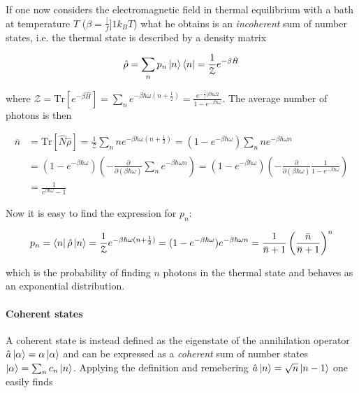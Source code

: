 \documentclass[a4paper, 11pt]{article}
\begin{document}
      If one now considers the electromagnetic field in thermal equilibrium with a bath at temperature $T$ ($\beta = \frac[f]{1}{k_BT}$) what he obtains is an \emph{incoherent} sum of number states, i.e. the thermal state is described by a density matrix

      \begin{equation*}
        \hat{\rho} = \sum_n p_n \ket{n}\bra{n} = \frac{1}{\mathcal{Z}} e^{-\beta\hat{H}}
      \end{equation*}

      where $\mathcal{Z} = \text{Tr}[e^{-\beta\hat{H}}] = \sum_n e^{-\beta\hbar\omega(n + \frac{1}{2})} = \frac{e^{-\frac[f]{\beta\hbar\omega}{2}}}{1 - e^{-\beta\hbar\omega}}$.
      The average number of photons is then

      \begin{align*}
        \overbar{n} & = \text{Tr}[\hat{N}\hat{\rho}] = \frac{1}{\mathcal{Z}} \sum_n n e^{-\beta\hbar\omega(n + \frac{1}{2})}
                      = (1 - e^{-\beta\hbar\omega}) \sum_n n e^{-\beta\hbar\omega n} \\
                    & = (1 - e^{-\beta\hbar\omega}) \left(-\frac{\partial}{\partial(\beta\hbar\omega)} \sum_n e^{-\beta\hbar\omega n} \right)
                      = (1 - e^{-\beta\hbar\omega}) \left(-\frac{\partial}{\partial(\beta\hbar\omega)} \frac{1}{1 - e^{-\beta\hbar\omega}} \right) \\
                    & = \frac{1}{e^{\beta\hbar\omega} - 1}
      \end{align*}

      Now it is easy to find the expression for $p_n$:

      \begin{equation*}
        p_n = \bra{n} \hat{\rho} \ket{n} = \frac{1}{\mathcal{Z}} e^{-\beta\hbar\omega(n + \frac{1}{2})} = (1 - e^{-\beta\hbar\omega}) e^{-\beta\hbar\omega n} = \frac{1}{\overbar{n} + 1} \left(\frac{\overbar{n}}{\overbar{n} + 1} \right)^n
      \end{equation*}

      which is the probability of finding $n$ photons in the thermal state and behaves as an exponential distribution.



    \paragraph{Coherent states}
      A coherent state is instead defined as the eigenstate of the annihilation operator $\hat{a}\ket{\alpha} = \alpha\ket{\alpha}$ and can be expressed as a \emph{coherent} sum of number states $\ket{\alpha} = \sum_n c_n \ket{n}$. Applying the definition and remebering $\hat{a}\ket{n} = \sqrt{n}\ket{n - 1}$ one easily finds
\end{document}
